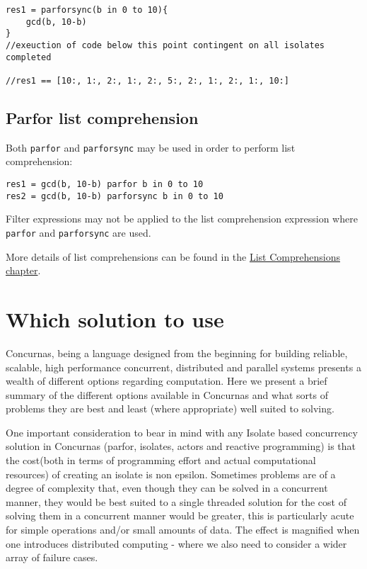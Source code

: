 \documentclass[conc-doc]{subfiles}
\begin{document}
\begin{lstlisting}
res1 = parforsync(b in 0 to 10){
	gcd(b, 10-b)
}
//exeuction of code below this point contingent on all isolates completed

//res1 == [10:, 1:, 2:, 1:, 2:, 5:, 2:, 1:, 2:, 1:, 10:]
\end{lstlisting}

\subsection{Parfor list comprehension}
Both \lstinline{parfor} and \lstinline{parforsync} may be used in order to perform list comprehension:

\begin{lstlisting}
res1 = gcd(b, 10-b) parfor b in 0 to 10
res2 = gcd(b, 10-b) parforsync b in 0 to 10
\end{lstlisting}

Filter expressions may not be applied to the list comprehension expression where \lstinline{parfor} and \lstinline{parforsync} are used.

More details of list comprehensions can be found in the \hyperref[ch:listComp]{List Comprehensions chapter}.

\section{Which solution to use}
Concurnas, being a language designed from the beginning for building reliable, scalable, high performance concurrent, distributed and parallel systems presents a wealth of different options regarding computation. Here we present a brief summary of the different options available in Concurnas and what sorts of problems they are best and least (where appropriate) well suited to solving.

One important consideration to bear in mind with any Isolate based concurrency solution in Concurnas (parfor, isolates, actors and reactive programming) is that the cost(both in terms of programming effort and actual computational resources) of creating an isolate is non epsilon. Sometimes problems are of a degree of complexity that, even though they can be solved in a concurrent manner, they would be best suited to a single threaded solution for the cost of solving them in a concurrent manner would be greater, this is particularly acute for simple operations and/or small amounts of data. The effect is magnified when one introduces distributed computing - where we also need to consider a wider array of failure cases.
\end{document}
